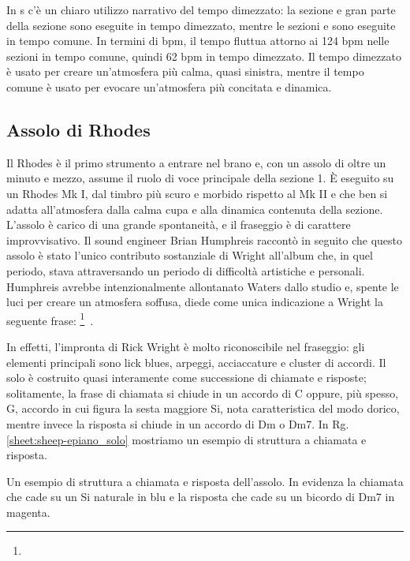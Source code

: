 \documentclass[class=book, crop=false, oneside, 12pt]{standalone}
\begin{document}
    In \acrshort{s} c'è un chiaro utilizzo narrativo del tempo dimezzato: la sezione  e gran parte della sezione  sono eseguite in tempo dimezzato, mentre le sezioni  e  sono eseguite in tempo comune. In termini di bpm, il tempo fluttua attorno ai 124 bpm nelle sezioni in tempo comune, quindi 62 bpm in tempo dimezzato. Il tempo dimezzato è usato per creare un'atmosfera più calma, quasi sinistra, mentre il tempo comune è usato per evocare un'atmosfera più concitata e dinamica.


    \subsection{Assolo di Rhodes}
    Il Rhodes è il primo strumento a entrare nel brano e, con un assolo di oltre un minuto e mezzo, assume il ruolo di voce principale della sezione 1. È eseguito su un Rhodes Mk I, dal timbro più scuro e morbido rispetto al Mk II e che ben si adatta all'atmosfera dalla calma cupa e alla dinamica contenuta della sezione. L'assolo è carico di una grande spontaneità, e il fraseggio è di carattere improvvisativo. Il sound engineer Brian Humphreis raccontò in seguito che questo assolo è stato l'unico contributo sostanziale di Wright all'album che, in quel periodo, stava attraversando un periodo di difficoltà artistiche e personali. Humphreis avrebbe intenzionalmente allontanato Waters dallo studio e,   spente le luci per creare un atmosfera soffusa, diede come unica indicazione a Wright la seguente frase: \footnote{}~\cite{easlea2022raving}.

    
    In effetti, l'impronta di Rick Wright è molto riconoscibile nel fraseggio: gli elementi principali sono lick blues, arpeggi, acciaccature e cluster di accordi. Il solo è costruito quasi interamente come successione di chiamate e risposte; solitamente, la frase di chiamata si chiude in un accordo di C oppure, più spesso, G, accordo in cui figura la sesta maggiore Si, nota caratteristica del modo dorico, mentre invece la risposta si chiude in un accordo di Dm o Dm7. In Rg.\ref{sheet:sheep-epiano_solo} mostriamo un esempio di struttura a chiamata e risposta.

    \begin{sheet}[htb]
        \centering
        \caption[Un esempio di struttura a chiamata e risposta dell'assolo.]{Un esempio di struttura a chiamata e risposta dell'assolo. In evidenza la chiamata che cade su un Si naturale in blu e la risposta che cade su un bicordo di Dm7 in magenta.}
        \label{sheet:sheep-epiano_solo}
    \end{sheet}
\end{document}
